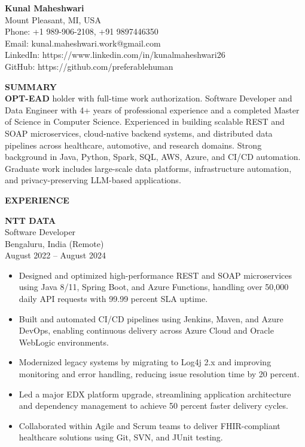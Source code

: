 \documentclass[letterpaper,12pt]{article}
\begin{document}
\textbf{Kunal Maheshwari} \\
Mount Pleasant, MI, USA \\
Phone: +1 989-906-2108, +91 9897446350 \\
Email: kunal.maheshwari.work@gmail.com \\
LinkedIn: https://www.linkedin.com/in/kunalmaheshwari26 \\
GitHub: https://github.com/preferablehuman

\vspace{6pt}

\textbf{SUMMARY} \\[2pt]
\textbf{OPT-EAD} holder with full-time work authorization. Software Developer and Data Engineer with 4+ years of professional experience and a completed Master of Science in Computer Science. Experienced in building scalable REST and SOAP microservices, cloud-native backend systems, and distributed data pipelines across healthcare, automotive, and research domains. Strong background in Java, Python, Spark, SQL, AWS, Azure, and CI/CD automation. Graduate work includes large-scale data platforms, infrastructure automation, and privacy-preserving LLM-based applications.

\vspace{6pt}

\textbf{EXPERIENCE}

\vspace{4pt}

\textbf{NTT DATA} \\
Software Developer \\
Bengaluru, India (Remote) \\
August 2022 -- August 2024
\begin{itemize}
  \item Designed and optimized high-performance REST and SOAP microservices using Java 8/11, Spring Boot, and Azure Functions, handling over 50,000 daily API requests with 99.99 percent SLA uptime.
  \item Built and automated CI/CD pipelines using Jenkins, Maven, and Azure DevOps, enabling continuous delivery across Azure Cloud and Oracle WebLogic environments.
  \item Modernized legacy systems by migrating to Log4j 2.x and improving monitoring and error handling, reducing issue resolution time by 20 percent.
  \item Led a major EDX platform upgrade, streamlining application architecture and dependency management to achieve 50 percent faster delivery cycles.
  \item Collaborated within Agile and Scrum teams to deliver FHIR-compliant healthcare solutions using Git, SVN, and JUnit testing.
\end{itemize}
\end{document}
